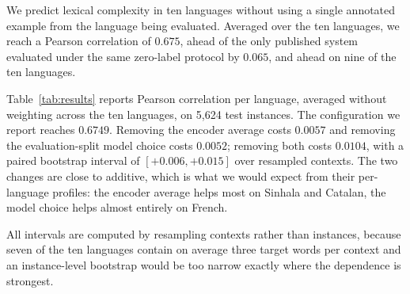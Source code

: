 %



We predict lexical complexity in ten languages without using a single
annotated example from the language being evaluated. Averaged over the
ten languages, we reach a Pearson correlation of $0.675$, ahead of the
only published system evaluated under the same zero-label protocol by
$0.065$, and ahead on nine of the ten languages.



Table~\ref{tab:results} reports Pearson correlation per language,
averaged without weighting across the ten languages, on 5{,}624 test
instances. The configuration we report reaches $0.6749$. Removing the
encoder average costs $0.0057$ and removing the evaluation-split model
choice costs $0.0052$; removing both costs $0.0104$, with a paired
bootstrap interval of $[+0.006, +0.015]$ over resampled contexts. The
two changes are close to additive, which is what we would expect from
their per-language profiles: the encoder average helps most on Sinhala
and Catalan, the model choice helps almost entirely on French.

All intervals are computed by resampling contexts rather than
instances, because seven of the ten languages contain on average three
target words per context and an instance-level bootstrap would be too
narrow exactly where the dependence is strongest.


